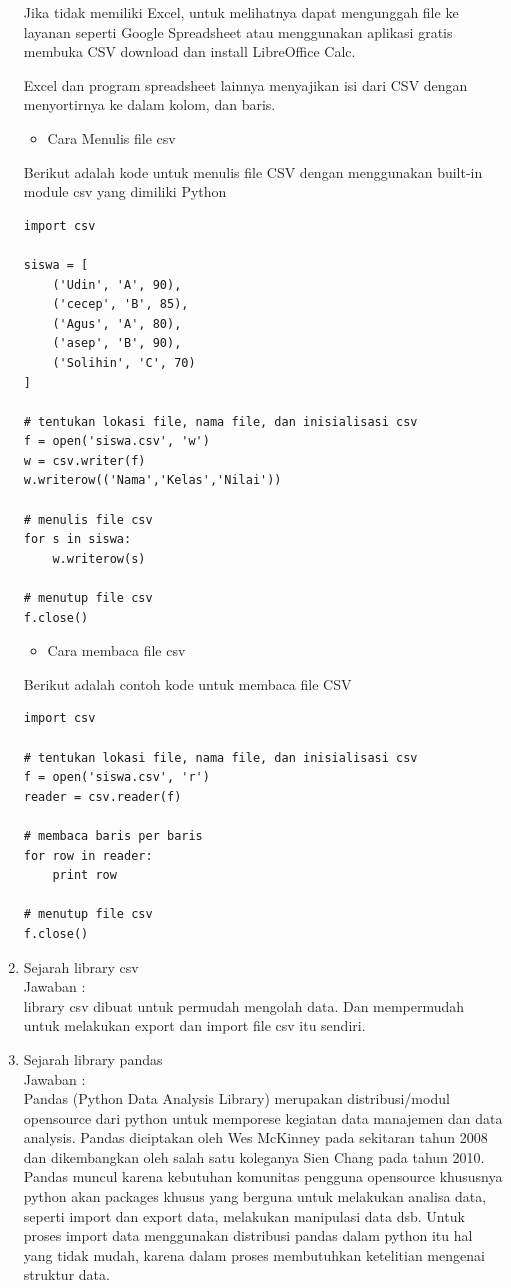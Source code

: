 \begin{enumerate}
Jika tidak memiliki Excel, untuk melihatnya dapat mengunggah file ke layanan seperti Google Spreadsheet atau menggunakan aplikasi gratis membuka CSV download dan install LibreOffice Calc.

Excel dan program spreadsheet lainnya menyajikan isi dari CSV dengan menyortirnya ke dalam kolom, dan baris.

\begin{itemize}
\item Cara Menulis file csv
\end{itemize}
Berikut adalah kode untuk menulis file CSV dengan menggunakan built-in module csv yang dimiliki Python

\begin{verbatim}
import csv

siswa = [
    ('Udin', 'A', 90),
    ('cecep', 'B', 85),
    ('Agus', 'A', 80),
    ('asep', 'B', 90),
    ('Solihin', 'C', 70)
]

# tentukan lokasi file, nama file, dan inisialisasi csv
f = open('siswa.csv', 'w')
w = csv.writer(f)
w.writerow(('Nama','Kelas','Nilai'))

# menulis file csv
for s in siswa:
    w.writerow(s)

# menutup file csv
f.close()
\end{verbatim}

\begin{itemize}
\item Cara membaca file csv
\end{itemize}

Berikut adalah contoh kode untuk membaca file CSV 

\begin{verbatim}
import csv

# tentukan lokasi file, nama file, dan inisialisasi csv
f = open('siswa.csv', 'r')
reader = csv.reader(f)

# membaca baris per baris
for row in reader:
    print row

# menutup file csv
f.close()
\end{verbatim}

\item Sejarah library csv\\
Jawaban :\\
library csv dibuat untuk permudah mengolah data. Dan mempermudah untuk melakukan export dan import file csv itu sendiri.


\item Sejarah library pandas\\
Jawaban :\\
Pandas (Python Data Analysis Library) merupakan distribusi/modul opensource dari python untuk memporese kegiatan data manajemen dan data analysis. Pandas diciptakan oleh Wes McKinney pada sekitaran tahun 2008 dan dikembangkan oleh salah satu koleganya Sien Chang pada tahun 2010. Pandas muncul karena kebutuhan komunitas pengguna opensource khususnya python akan packages khusus yang berguna untuk melakukan analisa data, seperti import dan export data, melakukan manipulasi data dsb. Untuk proses import data menggunakan distribusi pandas dalam python itu hal yang tidak mudah, karena dalam proses membutuhkan ketelitian mengenai struktur data.



\end{enumerate}
